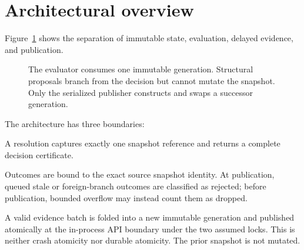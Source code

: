 \documentclass[11pt]{article}
\theoremstyle{definition}
\theoremstyle{plain}
\begin{document}
\section{Architectural overview}

Figure~\ref{fig:architecture} shows the separation of immutable state,
evaluation, delayed evidence, and publication.

\begin{figure}[ht]
\centering
{}
\caption{The evaluator consumes one immutable generation.  Structural
proposals branch from the decision but cannot mutate the snapshot.  Only the
serialized publisher constructs and swaps a successor generation.}
\label{fig:architecture}
\end{figure}

The architecture has three boundaries:

\begin{description}[leftmargin=31mm,style=nextline]
  \item[Evaluation boundary.] A resolution captures exactly one snapshot
  reference and returns a complete decision certificate.
  \item[Evidence boundary.] Outcomes are bound to the exact source snapshot
  identity.  At publication, queued stale or foreign-branch outcomes are
  classified as rejected; before publication, bounded overflow may instead
  count them as dropped.
  \item[Publication boundary.] A valid evidence batch is folded into a new
  immutable generation and published atomically at the in-process API boundary
  under the two assumed locks.  This is neither crash atomicity nor durable
  atomicity.  The prior snapshot is not mutated.
\end{description}
\end{document}
